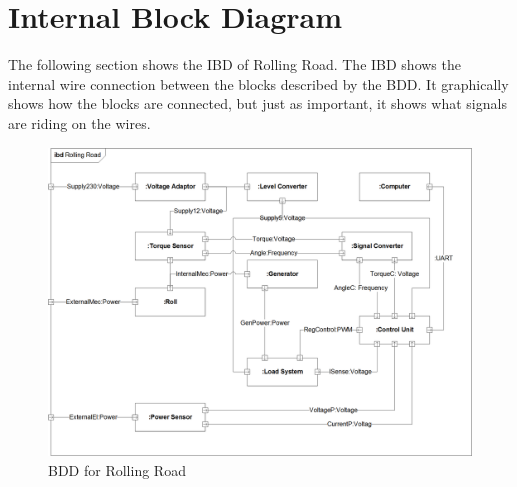 \section{Internal Block Diagram}
The following section shows the IBD of Rolling Road. The IBD shows the internal wire connection between the blocks described by the BDD. It graphically shows how the blocks are connected, but just as important, it shows what signals are riding on the wires.

\begin{figure}[H]
	\centering
	\includegraphics[width=1\linewidth]{Architecture/Diagrams/IBD_RR}
	\caption{BDD for Rolling Road}
	\label{fig:RR_BDD}
\end{figure}